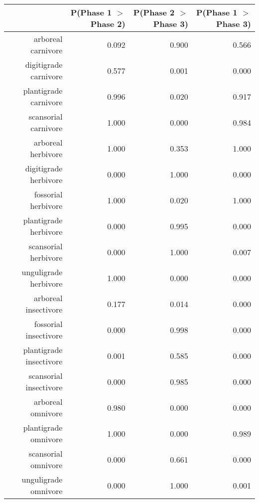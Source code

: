 \begin{table}[ht]
\centering
\begin{tabular}{rrrr}
  \hline
 & P(Phase 1 $>$ Phase 2) & P(Phase 2 $>$ Phase 3) & P(Phase 1 $>$ Phase 3) \\ 
  \hline
arboreal carnivore & 0.092 & 0.900 & 0.566 \\ 
  digitigrade carnivore & 0.577 & 0.001 & 0.000 \\ 
  plantigrade carnivore & 0.996 & 0.020 & 0.917 \\ 
  scansorial carnivore & 1.000 & 0.000 & 0.984 \\ 
  arboreal herbivore & 1.000 & 0.353 & 1.000 \\ 
  digitigrade herbivore & 0.000 & 1.000 & 0.000 \\ 
  fossorial herbivore & 1.000 & 0.020 & 1.000 \\ 
  plantigrade herbivore & 0.000 & 0.995 & 0.000 \\ 
  scansorial herbivore & 0.000 & 1.000 & 0.007 \\ 
  unguligrade herbivore & 1.000 & 0.000 & 0.000 \\ 
  arboreal insectivore & 0.177 & 0.014 & 0.000 \\ 
  fossorial insectivore & 0.000 & 0.998 & 0.000 \\ 
  plantigrade insectivore & 0.001 & 0.585 & 0.000 \\ 
  scansorial insectivore & 0.000 & 0.985 & 0.000 \\ 
  arboreal omnivore & 0.980 & 0.000 & 0.000 \\ 
  plantigrade omnivore & 1.000 & 0.000 & 0.989 \\ 
  scansorial omnivore & 0.000 & 0.661 & 0.000 \\ 
  unguligrade omnivore & 0.000 & 1.000 & 0.001 \\ 
   \hline
\end{tabular}
\label{tab:occur_plant}
\end{table}
